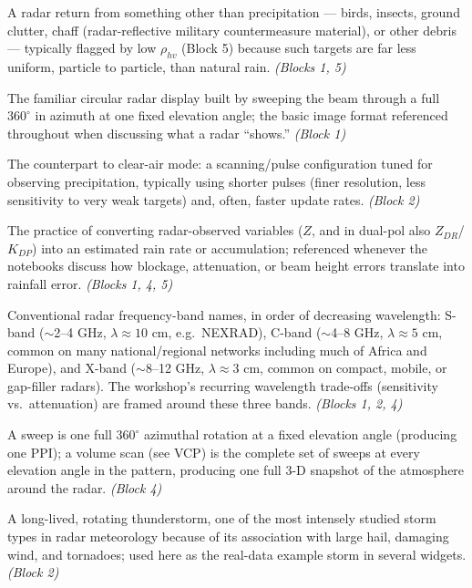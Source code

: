 \documentclass[11pt]{article}
\begin{document}
\begin{description}[leftmargin=2.4cm,style=nextline]
\item[Non-meteorological echo] A radar return from something other than precipitation --- birds, insects, ground clutter, chaff (radar-reflective military countermeasure material), or other debris --- typically flagged by low $\rho_{hv}$ (Block 5) because such targets are far less uniform, particle to particle, than natural rain. \emph{(Blocks 1, 5)}

\item[PPI (Plan Position Indicator)] The familiar circular radar display built by sweeping the beam through a full $360^\circ$ in azimuth at one fixed elevation angle; the basic image format referenced throughout when discussing what a radar ``shows.'' \emph{(Block 1)}

\item[Precipitation mode] The counterpart to clear-air mode: a scanning/pulse configuration tuned for observing precipitation, typically using shorter pulses (finer resolution, less sensitivity to very weak targets) and, often, faster update rates. \emph{(Block 2)}

\item[QPE (Quantitative Precipitation Estimation)] The practice of converting radar-observed variables ($Z$, and in dual-pol also $Z_{DR}$/$K_{DP}$) into an estimated rain rate or accumulation; referenced whenever the notebooks discuss how blockage, attenuation, or beam height errors translate into rainfall error. \emph{(Blocks 1, 4, 5)}

\item[S-band / C-band / X-band] Conventional radar frequency-band names, in order of decreasing wavelength: S-band ($\sim$2--4 GHz, $\lambda\approx10$ cm, e.g.\ NEXRAD), C-band ($\sim$4--8 GHz, $\lambda\approx5$ cm, common on many national/regional networks including much of Africa and Europe), and X-band ($\sim$8--12 GHz, $\lambda\approx3$ cm, common on compact, mobile, or gap-filler radars). The workshop's recurring wavelength trade-offs (sensitivity vs.\ attenuation) are framed around these three bands. \emph{(Blocks 1, 2, 4)}

\item[Sweep / volume scan] A sweep is one full $360^\circ$ azimuthal rotation at a fixed elevation angle (producing one PPI); a volume scan (see VCP) is the complete set of sweeps at every elevation angle in the pattern, producing one full 3-D snapshot of the atmosphere around the radar. \emph{(Block 4)}

\item[Supercell] A long-lived, rotating thunderstorm, one of the most intensely studied storm types in radar meteorology because of its association with large hail, damaging wind, and tornadoes; used here as the real-data example storm in several widgets. \emph{(Block 2)}

\end{description}
\end{document}
